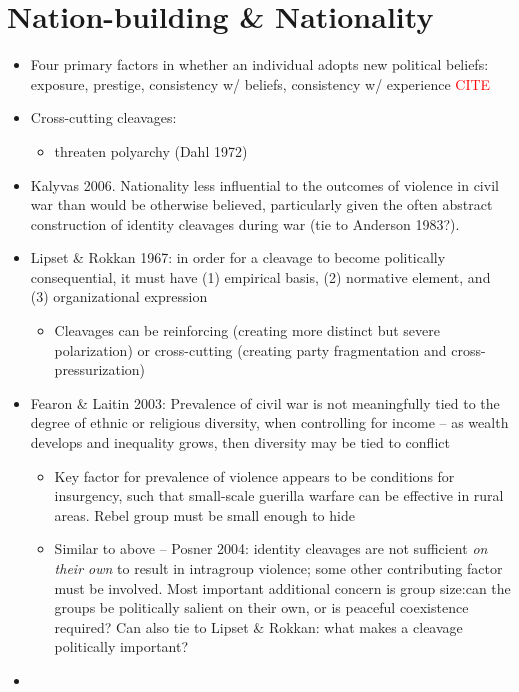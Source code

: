 \documentclass[12pt]{article}
\begin{document}
\section*{Nation-building \& Nationality}


\begin{itemize}
    \item Four primary factors in whether an individual adopts new political beliefs: exposure, prestige, consistency w/ beliefs, consistency w/ experience \textcolor{red}{CITE}
    \item Cross-cutting cleavages:
    \begin{itemize}
        \item threaten polyarchy (Dahl 1972)
    \end{itemize}
    \item Kalyvas 2006. Nationality less influential to the outcomes of violence in civil war than would be otherwise believed, particularly given the often abstract construction of identity cleavages during war (tie to Anderson 1983?). 
    \item Lipset \& Rokkan 1967: in order for a cleavage to become politically consequential, it must have (1) empirical basis, (2) normative element, and (3) organizational expression
    \begin{itemize}
        \item Cleavages can be reinforcing (creating more distinct but severe polarization) or cross-cutting (creating party fragmentation and cross-pressurization)
    \end{itemize}
    \item Fearon \& Laitin 2003: Prevalence of civil war is not meaningfully tied to the degree of ethnic or religious diversity, when controlling for income -- as wealth develops and inequality grows, then diversity may be tied to conflict
    \begin{itemize}
        \item Key factor for prevalence of violence appears to be conditions for insurgency, such that small-scale guerilla warfare can be effective in rural areas. Rebel group must be small enough to hide
        \item Similar to above -- Posner 2004: identity cleavages are not sufficient \emph{on their own} to result in intragroup violence; some other contributing factor must be involved. Most important additional concern is group size:can the groups be politically salient on their own, or is peaceful coexistence required? Can also tie to Lipset \& Rokkan: what makes a cleavage politically important?
    \end{itemize}
    \item 
\end{itemize}
\end{document}

